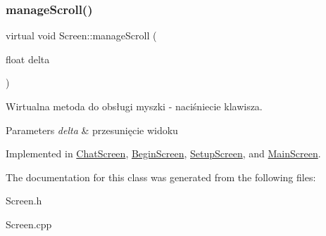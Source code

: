 \subsubsection{\texorpdfstring{manageScroll()}{manageScroll()}}
{\footnotesize\ttfamily virtual void Screen\+::manage\+Scroll (\begin{DoxyParamCaption}\item[{float}]{delta }\end{DoxyParamCaption})\hspace{0.3cm}{\ttfamily [pure virtual]}}



Wirtualna metoda do obsługi myszki -\/ naciśniecie klawisza. 


\begin{DoxyParams}{Parameters}
{\em delta} & przesunięcie widoku \\
\hline
\end{DoxyParams}


Implemented in \mbox{\hyperlink{class_chat_screen_abd1fd89f6ecc5ddbc233a04e571de9be}{Chat\+Screen}}, \mbox{\hyperlink{class_begin_screen_aa105e5520474e8d9eb1f108cf736967b}{Begin\+Screen}}, \mbox{\hyperlink{class_setup_screen_af1374ba49c48b6b4a832b54422851e5d}{Setup\+Screen}}, and \mbox{\hyperlink{class_main_screen_a54826570ce34b97e35f89fdc90b98bed}{Main\+Screen}}.



The documentation for this class was generated from the following files\+:\begin{DoxyCompactItemize}
\item 
Screen.\+h\item 
Screen.\+cpp\end{DoxyCompactItemize}
